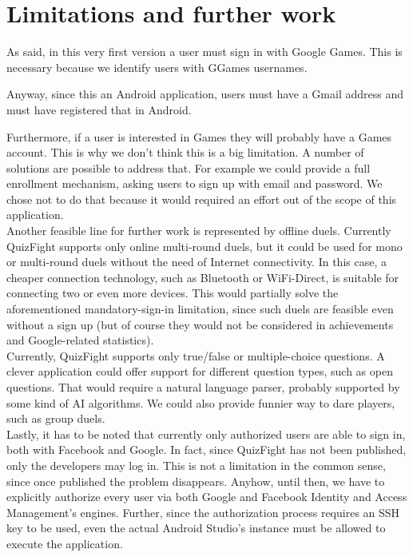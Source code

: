 \section{Limitations and further work}

As said, in this very first version a user must sign in with Google Games.
This is necessary because we identify users with GGames usernames.

Anyway, since this an Android application, users must have a Gmail address and
must have registered that in Android.

Furthermore, if a user is interested in Games they will probably have a Games
account.
This is why we don't think this is a big limitation.
A number of solutions are possible to address that.
For example we could provide a full enrollment mechanism, asking users to sign
up with email and password. We chose not to do that because it would required
an effort out of the scope of this application.  \\

Another feasible line for further work is represented by offline duels.
Currently QuizFight supports only online multi-round duels, but it could be
used for mono or multi-round duels without the need of Internet connectivity.
In this case, a cheaper connection technology, such as Bluetooth or
WiFi-Direct, is suitable for connecting two or even more devices.
This would partially solve the aforementioned mandatory-sign-in limitation,
since such duels are feasible even without a sign up (but of course they would
not be considered in achievements and Google-related statistics). \\

Currently, QuizFight supports only true/false or multiple-choice questions.
A clever application could offer support for different question types, such as
open questions.
That would require a natural language parser, probably supported by some kind of AI
algorithms.
We could also provide funnier way to dare players, such as group duels. \\

Lastly, it has to be noted that currently only authorized users are able to sign
in, both with Facebook and Google. In fact, since QuizFight has not been
published, only the developers may log in. This is not a limitation in the 
common sense, since once published the problem disappears. Anyhow, until then,
we have to explicitly authorize every user via both Google and Facebook Identity
and Access Management's engines. Further, since the authorization process 
requires an SSH key to be used, even the actual Android Studio's instance must
be allowed to execute the application. 
